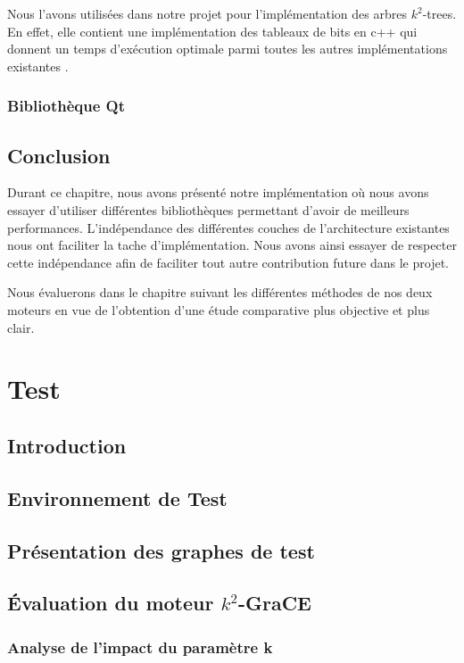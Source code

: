 \documentclass[a4paper,oneside,12pt]{report}
\theoremstyle{definition}
\begin{document}
Nous l'avons utilisées dans notre projet pour l'implémentation des arbres $k^2$-trees. En effet, elle contient une implémentation des tableaux de bits en c++ qui donnent un temps d'exécution optimale parmi toutes les autres implémentations existantes \citep{pieterse2010performance}.  



		\subsection{Bibliothèque Qt }
	\section{Conclusion}
	
Durant ce chapitre, nous avons présenté notre implémentation où nous avons essayer d'utiliser différentes bibliothèques permettant d'avoir de meilleurs performances. L'indépendance des différentes couches de l'architecture existantes nous ont faciliter la tache d'implémentation. Nous avons ainsi essayer de respecter cette indépendance afin de faciliter tout autre contribution future dans le projet. 

Nous évaluerons dans le chapitre suivant les différentes méthodes de nos deux moteurs en vue de l'obtention d'une étude comparative plus objective et plus clair.



\chapter{Test}
	\section{Introduction}
	\section{Environnement de Test}
	\section{Présentation des graphes de test}
	\section{Évaluation du moteur $k^2$-GraCE}
			\subsection{Analyse de l'impact du paramètre k}
\end{document}
